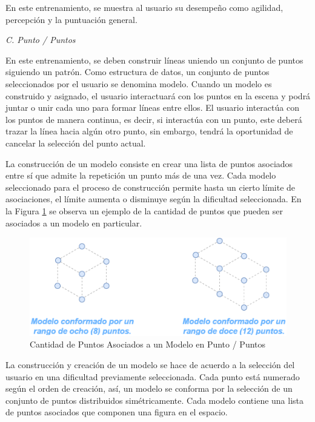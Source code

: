 \documentclass[conference]{IEEEtran}
\begin{document}
En este entrenamiento, se muestra al usuario su desempeño como agilidad, percepción y la puntuación general.
\bigskip

\textit{C. Punto / Puntos}
\medskip

En este entrenamiento, se deben construir líneas uniendo un conjunto de puntos siguiendo un patrón. Como estructura de datos, un conjunto de puntos seleccionados por el usuario se denomina modelo. Cuando un modelo es construido y asignado, el usuario interactuará con los puntos en la escena y podrá juntar o unir cada uno para formar líneas entre ellos. El usuario interactúa con los puntos de manera continua, es decir, si interactúa con un punto, este deberá trazar la línea hacia algún otro punto, sin embargo, tendrá la oportunidad de cancelar la selección del punto actual.

La construcción de un modelo consiste en crear una lista de puntos asociados entre sí que admite la repetición un punto más de una vez. Cada modelo seleccionado para el proceso de construcción permite hasta un cierto límite de asociaciones, el límite aumenta o disminuye según la dificultad seleccionada. En la Figura \ref{fig:conpuntos} se observa un ejemplo de la cantidad de puntos que pueden ser asociados a un modelo en particular.

\begin{figure}[htpb!]
 \centering 
\includegraphics[width=1.0\columnwidth]{images/conpuntos.png}
\caption{Cantidad de Puntos Asociados a un Modelo en Punto / Puntos}
\label{fig:conpuntos}
\end{figure}

La construcción y creación de un modelo se hace de acuerdo a la selección del usuario en una dificultad previamente seleccionada. Cada punto está numerado según el orden de creación, así, un modelo se conforma por la selección de un conjunto de puntos distribuidos simétricamente. Cada modelo contiene una lista de puntos asociados que componen una figura en el espacio.
\end{document}
